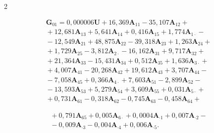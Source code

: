 \begin{multicols}{2}
\vspace*{-2pt}





\noindent


 \begin{multline*}


  \bm{G}_{01}=0{,}000006 \bm{U} + 16{,}369\bm{A}_{11} - 35{,}107\bm{A}_{12} + {}\\


  {}+12{,}681\bm{A}_{13} + 5{,}641\bm{A}_{14} + 0{,}416\bm{A}_{15} + 1{,}774\bm{A}_{1\cdot} - {}\\


{}-12{,}549\bm{A}_{21} + 48{,}875\bm{A}_{22} - 39{,}318\bm{A}_{23} + 1{,}263\bm{A}_{24} + {}\\


{}+ 1{,}729\bm{A}_{25} - 3{,}812\bm{A}_{2\cdot} - 16{,}162\bm{A}_{31} + 9{,}717\bm{A}_{32} + {}\\


{}+21{,}364\bm{A}_{33} - 15{,}431\bm{A}_{34} + 0{,}512\bm{A}_{35} + 1{,}636\bm{A}_{3\cdot} + {}\\


{}+ 4{,}007\bm{A}_{41} - 20{,}268\bm{A}_{42} + 19{,}612\bm{A}_{43} + 3{,}707\bm{A}_{44} - {}\\


{}-7{,}058\bm{A}_{45} + 0{,}366\bm{A}_{4\cdot} + 7{,}603\bm{A}_{51} - 2{,}899\bm{A}_{52} - {}\\


{}- 13{,}593\bm{A}_{53} + 5{,}279\bm{A}_{54} + 3{,}609\bm{A}_{55} + 0,031\bm{A}_{5\cdot} + {}\\


{}+ 0{,}731\bm{A}_{61} - 0{,}318\bm{A}_{62} - 0{,}745\bm{A}_{63} - 0{,}458\bm{A}_{64} + {}


\end{multline*}





\noindent


\begin{multline*}


{}+0{,}791\bm{A}_{65} + 0{,}005\bm{A}_{6\cdot} + 0{,}0004\bm{A}_{\cdot1} + 0{,}007\bm{A}_{\cdot 2} -{}\\


{}- 0{,}009\bm{A}_{\cdot 3} - 0{,}004\bm{A}_{\cdot 4} + 0{,}006\bm{A}_{\cdot 5}.


\end{multline*}






\end{multicols}
